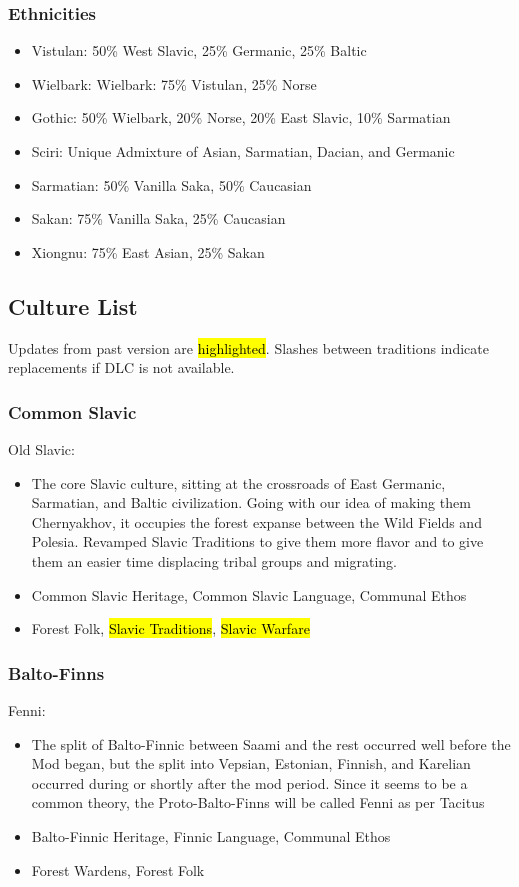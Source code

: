 \documentclass{article}
\begin{document}
	\subsubsection{Ethnicities}
	\begin{itemize}
		\item Vistulan: 50\% West Slavic, 25\% Germanic, 25\% Baltic
		\item Wielbark: Wielbark: 75\% Vistulan, 25\% Norse
		\item Gothic: 50\% Wielbark, 20\% Norse, 20\% East Slavic, 10\% Sarmatian
		\item Sciri: Unique Admixture of Asian, Sarmatian, Dacian, and Germanic
		\item Sarmatian: 50\% Vanilla Saka, 50\% Caucasian
		\item Sakan: 75\% Vanilla Saka, 25\% Caucasian
		\item Xiongnu: 75\% East Asian, 25\% Sakan
	\end{itemize}
	
	\subsection{Culture List}
	Updates from past version are \hl{highlighted}.
	Slashes between traditions indicate replacements if DLC is not available.
	
	\subsubsection{Common Slavic}
	
	Old Slavic:
	\begin{itemize}
		\item The core Slavic culture, sitting at the crossroads of East Germanic, Sarmatian, and Baltic civilization. Going with our idea of making them Chernyakhov, it occupies the forest expanse between the Wild Fields and Polesia.
		\newline
		Revamped Slavic Traditions to give them more flavor and to give them an easier time displacing tribal groups and migrating.
		\item Common Slavic Heritage, Common Slavic Language, Communal Ethos
		\item Forest Folk, \hl{Slavic Traditions}, \hl{Slavic Warfare}
	\end{itemize}
	
	\subsubsection{Balto-Finns}
	Fenni:
	\begin{itemize}
		\item The split of Balto-Finnic between Saami and the rest occurred well before the Mod began, but the split into Vepsian, Estonian, Finnish, and Karelian occurred during or shortly after the mod period.
		Since it seems to be a common theory, the Proto-Balto-Finns will be called Fenni as per Tacitus
		\item Balto-Finnic Heritage, Finnic Language, Communal Ethos
		\item Forest Wardens, Forest Folk
	\end{itemize}
	
\end{document}
